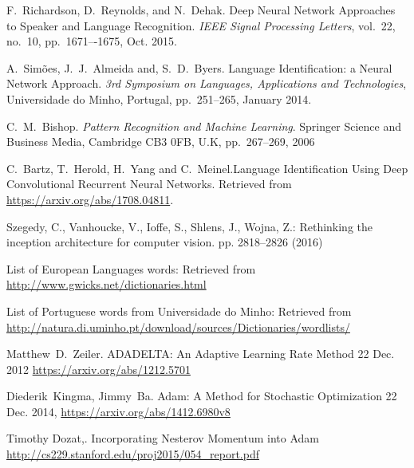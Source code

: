 \documentclass[journal, a4paper]{IEEEtran}
\begin{document}
\begin{thebibliography}{9}
	F.~Richardson, D.~Reynolds, and N.~Dehak. Deep Neural Network Approaches to Speaker and Language Recognition. {\em IEEE Signal Processing Letters},
	vol.~22, no.~10, pp.~1671–-1675, Oct. 2015.

	A.~Simões, J.~J.~Almeida and, S.~D.~Byers. Language Identification: a Neural Network Approach. {\em 3rd Symposium on Languages, Applications and Technologies}, Universidade do Minho, Portugal, pp.~251--265, January 2014.

	C.~M.~Bishop. {\em Pattern Recognition and Machine Learning}. Springer Science and Business Media,
	Cambridge CB3 0FB, U.K, pp.~267--269, 2006

    C.~Bartz, T.~Herold, H.~Yang and C.~Meinel.Language Identification Using Deep Convolutional Recurrent Neural Networks.
	Retrieved from \url{https://arxiv.org/abs/1708.04811}.

     Szegedy, C., Vanhoucke, V., Ioffe, S., Shlens, J., Wojna, Z.: Rethinking the inception architecture for computer vision. pp. 2818–2826 (2016)
	
	List of European Languages words: 
	Retrieved from \url{http://www.gwicks.net/dictionaries.html}
	
	List of Portuguese words from Universidade do Minho:
	Retrieved from \url{http://natura.di.uminho.pt/download/sources/Dictionaries/wordlists/}

  Matthew~D.~Zeiler. ADADELTA: An Adaptive Learning Rate Method
  22 Dec. 2012 \url{https://arxiv.org/abs/1212.5701}

  Diederik~Kingma, Jimmy~Ba. Adam: A Method for Stochastic Optimization
  22 Dec. 2014, \url{https://arxiv.org/abs/1412.6980v8}

  Timothy Dozat,. Incorporating Nesterov Momentum into Adam
  \url{http://cs229.stanford.edu/proj2015/054_report.pdf}
\end{thebibliography}
\end{document}
